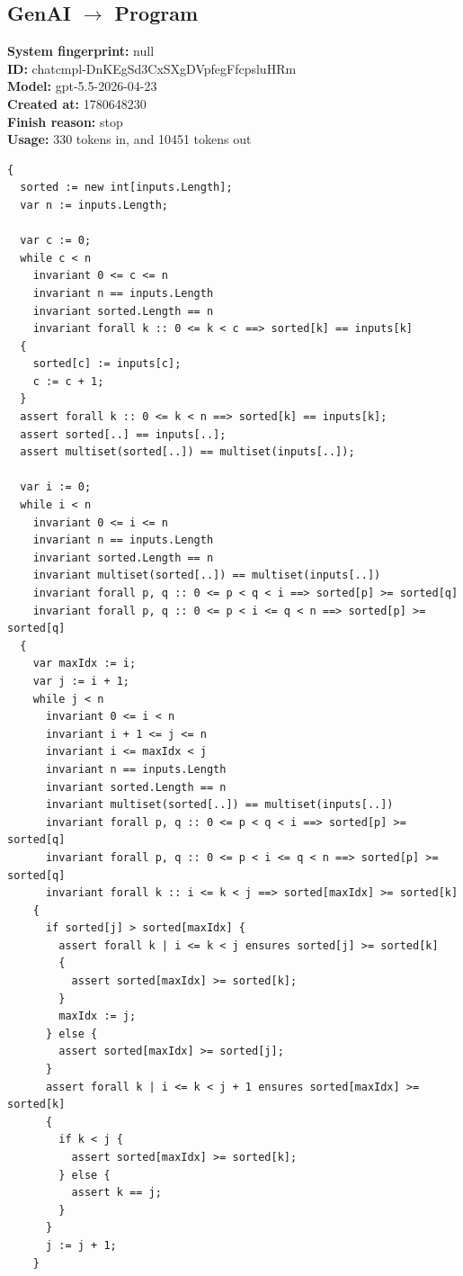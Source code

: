 \documentclass{article}
\begin{document}
\subsection*{GenAI $\rightarrow$ Program}
\textbf{System fingerprint: }null
\\\textbf{ID: }chatcmpl-DnKEgSd3CxSXgDVpfegFfcpsluHRm
\\\textbf{Model: }gpt-5.5-2026-04-23
\\\textbf{Created at: }1780648230
\\\textbf{Finish reason: }stop
\\\textbf{Usage: }330 tokens in, and 10451 tokens out
\begin{lstlisting}
{
  sorted := new int[inputs.Length];
  var n := inputs.Length;

  var c := 0;
  while c < n
    invariant 0 <= c <= n
    invariant n == inputs.Length
    invariant sorted.Length == n
    invariant forall k :: 0 <= k < c ==> sorted[k] == inputs[k]
  {
    sorted[c] := inputs[c];
    c := c + 1;
  }
  assert forall k :: 0 <= k < n ==> sorted[k] == inputs[k];
  assert sorted[..] == inputs[..];
  assert multiset(sorted[..]) == multiset(inputs[..]);

  var i := 0;
  while i < n
    invariant 0 <= i <= n
    invariant n == inputs.Length
    invariant sorted.Length == n
    invariant multiset(sorted[..]) == multiset(inputs[..])
    invariant forall p, q :: 0 <= p < q < i ==> sorted[p] >= sorted[q]
    invariant forall p, q :: 0 <= p < i <= q < n ==> sorted[p] >= sorted[q]
  {
    var maxIdx := i;
    var j := i + 1;
    while j < n
      invariant 0 <= i < n
      invariant i + 1 <= j <= n
      invariant i <= maxIdx < j
      invariant n == inputs.Length
      invariant sorted.Length == n
      invariant multiset(sorted[..]) == multiset(inputs[..])
      invariant forall p, q :: 0 <= p < q < i ==> sorted[p] >= sorted[q]
      invariant forall p, q :: 0 <= p < i <= q < n ==> sorted[p] >= sorted[q]
      invariant forall k :: i <= k < j ==> sorted[maxIdx] >= sorted[k]
    {
      if sorted[j] > sorted[maxIdx] {
        assert forall k | i <= k < j ensures sorted[j] >= sorted[k]
        {
          assert sorted[maxIdx] >= sorted[k];
        }
        maxIdx := j;
      } else {
        assert sorted[maxIdx] >= sorted[j];
      }
      assert forall k | i <= k < j + 1 ensures sorted[maxIdx] >= sorted[k]
      {
        if k < j {
          assert sorted[maxIdx] >= sorted[k];
        } else {
          assert k == j;
        }
      }
      j := j + 1;
    }


\end{lstlisting}
\end{document}
